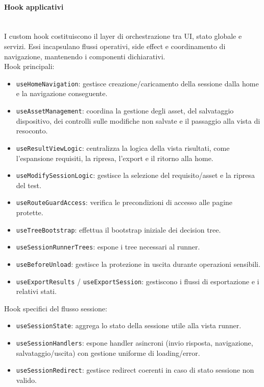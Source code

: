 \documentclass[a4paper,12pt]{article}
\begin{document}
            \paragraph{Hook applicativi}\mbox{}\\
                I custom hook costituiscono il layer di orchestrazione tra UI, stato globale e servizi. Essi incapsulano flussi operativi, side effect e coordinamento di navigazione, mantenendo i componenti dichiarativi. \\
                Hook principali:
                \begin{itemize}
                    \item \texttt{useHomeNavigation}: gestisce creazione/caricamento della sessione dalla home e la navigazione conseguente.
                    \item \texttt{useAssetManagement}: coordina la gestione degli asset, del salvataggio dispositivo, dei controlli sulle modifiche non salvate e il passaggio alla vista di resoconto.
                    \item \texttt{useResultViewLogic}: centralizza la logica della vista risultati, come l'espansione requisiti, la ripresa, l'export e il ritorno alla home.
                    \item \texttt{useModifySessionLogic}: gestisce la selezione del requisito/asset e la ripresa del test.
                    \item \texttt{useRouteGuardAccess}: verifica le precondizioni di accesso alle pagine protette.
                    \item \texttt{useTreeBootstrap}: effettua il bootstrap iniziale dei decision tree.
                    \item \texttt{useSessionRunnerTrees}: espone i tree necessari al runner.
                    \item \texttt{useBeforeUnload}: gestisce la protezione in uscita durante operazioni sensibili.
                    \item \texttt{useExportResults} / \texttt{useExportSession}: gestiscono i flussi di esportazione e i relativi stati.
                \end{itemize}
                Hook specifici del flusso sessione:
                \begin{itemize}
                    \item \texttt{useSessionState}: aggrega lo stato della sessione utile alla vista runner.
                    \item \texttt{useSessionHandlers}: espone handler asincroni (invio risposta, navigazione, salvataggio/uscita) con gestione uniforme di loading/error.
                    \item \texttt{useSessionRedirect}: gestisce redirect coerenti in caso di stato sessione non valido.
                \end{itemize}
        
\end{document}
